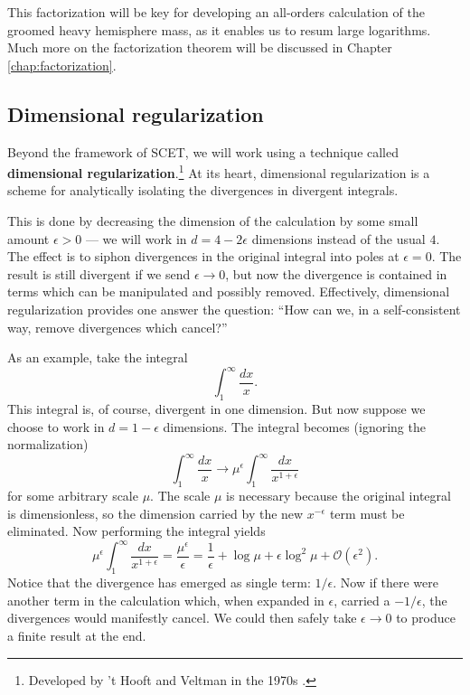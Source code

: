 \documentclass[../thesis.tex]{subfiles}
\providecommand{\cO}{\mathcal{O}}
\begin{document}
	This factorization will be key for developing an all-orders calculation of the groomed heavy hemisphere mass, as it enables us to resum large logarithms. Much more on the factorization theorem will be discussed in Chapter \ref{chap:factorization}.

\subsection{Dimensional regularization}
	Beyond the framework of SCET, we will work using a technique called \textbf{dimensional regularization}.\footnote{Developed by 't Hooft and Veltman in the 1970s \cite{t_hooft_regularization_1972}.} At its heart, dimensional regularization is a scheme for analytically isolating the divergences in divergent integrals. 

	This is done by decreasing the dimension of the calculation by some small amount $\epsilon > 0$ --- we will work in $d = 4 - 2\epsilon$ dimensions instead of the usual $4$. The effect is to siphon divergences in the original integral into poles at $\epsilon = 0$. The result is still divergent if we send $\epsilon \to 0$, but now the divergence is contained in terms which can be manipulated and possibly removed. Effectively, dimensional regularization provides one answer the question: ``How can we, in a self-consistent way, remove divergences which cancel?''

	As an example, take the integral
	\begin{equation}
		\int_1^\infty \frac{dx}{x}.
	\end{equation}
	This integral is, of course, divergent in one dimension. But now suppose we choose to work in $d = 1 - \epsilon$ dimensions. The integral becomes (ignoring the normalization)
	\begin{equation}
		\int_1^\infty \frac{dx}{x} \to \mu^\epsilon \int_1^\infty \frac{dx}{x^{1 + \epsilon}}
	\end{equation}
	for some arbitrary scale $\mu$. The scale $\mu$ is necessary because the original integral is dimensionless, so the dimension carried by the new $x^{-\epsilon}$ term must be eliminated. Now performing the integral yields
	\begin{equation}
		\mu^\epsilon \int_1^\infty \frac{dx}{x^{1 + \epsilon}} = \frac{\mu^\epsilon}{\epsilon} = \frac{1}{\epsilon} + \log \mu + \epsilon \log^2 \mu + \cO(\epsilon^2).
	\end{equation}
	Notice that the divergence has emerged as single term: $1/\epsilon$. Now if there were another term in the calculation which, when expanded in $\epsilon$, carried a $-1/\epsilon$, the divergences would manifestly cancel. We could then safely take $\epsilon \to 0$ to produce a finite result at the end.
\end{document}
